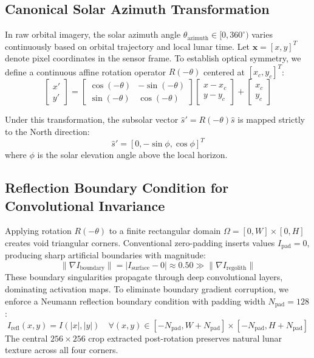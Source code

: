\documentclass[10pt,journal,compsoc]{IEEEtran}
\theoremstyle{definition}
\begin{document}
\subsection{Canonical Solar Azimuth Transformation}
In raw orbital imagery, the solar azimuth angle $\theta_{\text{azimuth}} \in [0, 360^\circ)$ varies continuously based on orbital trajectory and local lunar time. Let $\mathbf{x} = [x, y]^T$ denote pixel coordinates in the sensor frame. To establish optical symmetry, we define a continuous affine rotation operator $R(-\theta)$ centered at $[x_c, y_c]^T$:
\begin{equation}
\begin{bmatrix} x' \\ y' \end{bmatrix} = \begin{bmatrix} \cos(-\theta) & -\sin(-\theta) \\ \sin(-\theta) & \cos(-\theta) \end{bmatrix} \begin{bmatrix} x - x_c \\ y - y_c \end{bmatrix} + \begin{bmatrix} x_c \\ y_c \end{bmatrix}
\label{eq:rotation}
\end{equation}

Under this transformation, the subsolar vector $\hat{s}' = R(-\theta) \hat{s}$ is mapped strictly to the North direction:
\begin{equation}
\hat{s}' = [0, -\sin\phi, \cos\phi]^T
\end{equation}
where $\phi$ is the solar elevation angle above the local horizon.

\subsection{Reflection Boundary Condition for Convolutional Invariance}
Applying rotation $R(-\theta)$ to a finite rectangular domain $\Omega = [0, W] \times [0, H]$ creates void triangular corners. Conventional zero-padding inserts values $I_{\text{pad}} = 0$, producing sharp artificial boundaries with magnitude:
\begin{equation}
\|\nabla I_{\text{boundary}}\| = |I_{\text{surface}} - 0| \approx 0.50 \gg \|\nabla I_{\text{regolith}}\|
\end{equation}
These boundary singularities propagate through deep convolutional layers, dominating activation maps. To eliminate boundary gradient corruption, we enforce a Neumann reflection boundary condition with padding width $N_{\text{pad}} = 128$:
\begin{equation}
I_{\text{refl}}(x, y) = I(|x|, |y|) \quad \forall (x,y) \in [-N_{\text{pad}}, W+N_{\text{pad}}] \times [-N_{\text{pad}}, H+N_{\text{pad}}]
\end{equation}
The central $256 \times 256$ crop extracted post-rotation preserves natural lunar texture across all four corners.
\end{document}
